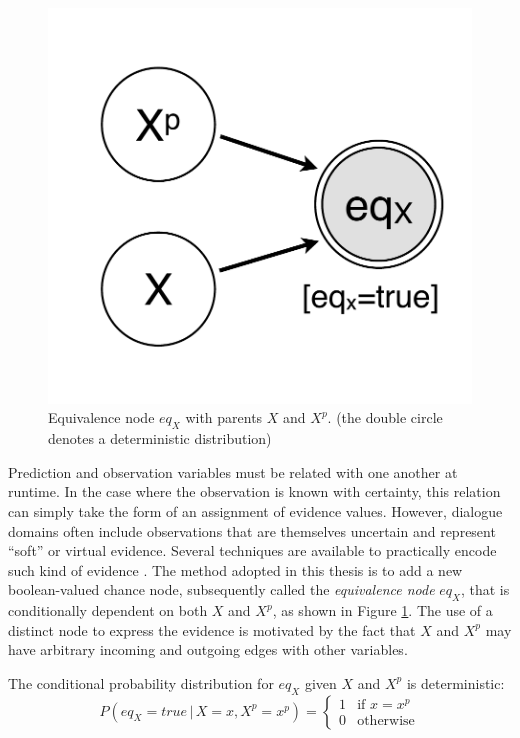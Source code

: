 \begin{figure}
\vspace{-5mm}
\centering
\includegraphics[scale=0.25]{imgs/prediction.pdf} 
\vspace{-2mm}
\caption{Equivalence node $\mathit{eq}_{X}$ with parents $X$ and $X^p$. (the double circle denotes a deterministic distribution)}
\label{fig:prediction}
\end{figure}

Prediction and observation variables must be related with one another at runtime.  In the case where the observation is known with certainty, this relation can simply take the form of an assignment of evidence values.  However, dialogue domains often include observations that are themselves uncertain and represent ``soft'' or virtual evidence.  Several techniques are available to practically encode such kind of evidence \citep{Pan06beliefupdate}. The method adopted in this thesis is to add a new boolean-valued chance node, subsequently called the \textit{equivalence node} $\mathit{eq}_{X}$, that is conditionally dependent on both $X$ and $X^p$, as shown in Figure \ref{fig:prediction}. The use of a distinct node to express the evidence is motivated by the fact that $X$ and $X^p$ may have arbitrary incoming and outgoing edges with other variables. 

The conditional probability distribution for $\mathit{eq}_X$ given $X$ and $X^p$ is deterministic:
\begin{equation}
P(\mathit{eq}_{X}\!=\!true \, | \, X\!=\!x, X^p\!=\!x^p) = \begin{cases}
1 & \text{if } x = x^p \\
0 & \text{otherwise}
\end{cases} \label{eq:equivdistrib}
\end{equation}

